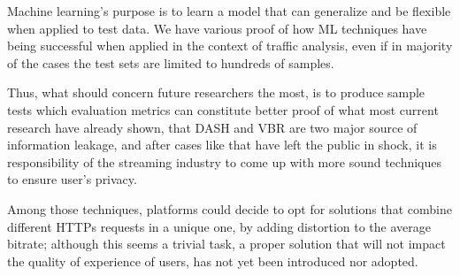 Machine learning's purpose is to learn a model that can generalize and be
flexible when applied to test data. We have various proof of how ML techniques
have being successful when applied in the context of traffic analysis, even if
in majority of the cases the test sets are limited to hundreds of samples.

Thus, what should concern future researchers the most, is to produce sample
tests which evaluation metrics can constitute better proof of what most current
research have already shown, that DASH and VBR are two major source of
information leakage, and after cases like \cite{analytica} that have left the
public in shock, it is responsibility of the streaming industry to come up with
more sound techniques to ensure user's privacy.

Among those techniques, platforms could decide to opt for solutions that
combine different HTTPs requests in a unique one, by adding distortion to the
average bitrate; although this seems a trivial task, a proper solution that
will not impact the quality of experience of users, has not yet been introduced
nor adopted.

